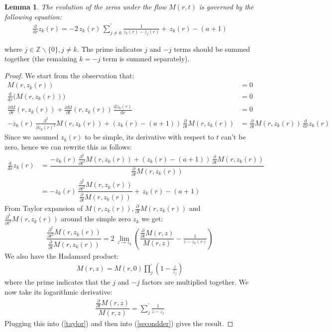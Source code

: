 \documentclass[a4paper,11pt,twoside]{amsart}
\newtheorem{lemma}[theorem]{Lemma}
\newcommand{\verifiedeq}{=}
\newcommand{\verifiedeq}{\stackrel{\checkmark}{=}}
\begin{document}
\begin{lemma}\label{proofBes2} The evolution of the zeros under the flow $M(r,t)$ is governed by the following equation:
\begin{align}
 \frac{\mathrm{d}}{\mathrm{d} r}z_k(r) \verifiedeq -2\, z_k(r)\,\sum_{j \ne k}^{'} \frac{1}{z_k(r)-z_j(r)} +\,z_k(r)-(a+1)
\end{align}
\end{lemma}
where $j \in \mathbb{Z}\backslash\{0\}, j \ne k$. The prime indicates $j$ and $-j$ terms should be summed together (the remaining $k=-j$ term is summed separately).
\begin{proof}
We start from the observation that:
\begin{align}
M(r,z_k(r)) &\verifiedeq 0 \\
\frac{\mathrm{d}}{\mathrm{d} r} \big(M(r,z_k(r))\big) &\verifiedeq 0 \\
\frac{\partial M}{\partial r}(r,z_k(r))+ \frac{\partial M}{\partial t}(r,z_k(r))\,\frac{\mathrm{d} z_k(r)}{\mathrm{d} r} &\verifiedeq 0 \\
-z_k(r)\,\frac{\partial^2}{\partial z_k(r)^2}M(r,z_k(r)) + (z_k(r)-(a+1))\,\frac{\partial }{\partial t}M(r,z_k(r))  &\verifiedeq \frac{\partial}{\partial t}M(r,z_k(r))\,\frac{\mathrm{d}}{\mathrm{d} r}z_k(r)
\end{align}
Since we assumed $z_k(r)$ to be simple, its derivative with respect to $t$ can't be zero, hence we can rewrite this as follows:
\begin{align}
\frac{\mathrm{d} }{\mathrm{d} r}z_k(r) &\verifiedeq \dfrac{-z_k(r)\,\frac{\partial^2}{\partial t^2}M(r,z_k(r)) + (z_k(r)-(a+1))\,\frac{\partial }{\partial t}M(r,z_k(r))}{ \frac{\partial}{\partial t}M(r,z_k(r))} \\
&\verifiedeq -z_k(r)\,\dfrac{\frac{\partial^2}{\partial t^2}M(r,z_k(r))}{ \frac{\partial}{\partial t}M(r,z_k(r))}  + \,z_k(r)-(a+1)\label{secondder}
\end{align}
From Taylor expansion of $M(r,z_k(r)), \frac{\partial}{\partial t}M(r,z_k(r))$ and $\frac{\partial^2}{\partial t^2}M(r,z_k(r))$ around the simple zero $z_k$ we get:
\begin{align}\label{taylor}
 \dfrac{\frac{\partial^2}{\partial t^2}M(r,z_k(r))}{\frac{\partial}{\partial t}M(r,z_k(r))} \verifiedeq 2\,\lim_{z\to z_k} \left(\dfrac{\frac{\partial}{\partial t}M(r,z)}{M(r,z)} -\frac{1}{z - z_k(r)} \right)
\end{align}
We also have the Hadamard product: 
\begin{align}
  M(r,z) \verifiedeq M(r,0)\prod_j^{'}\left(1-\frac{z}{z_j}\right)
\end{align}
where the prime indicates that the $j$ and $-j$ factors are multiplied together. We now take its logarithmic derivative:
\begin{align}
  \dfrac{\frac{\partial}{\partial t}M(r,z)}{M(r,z)} \verifiedeq \sum_j^{'} \frac{1}{z-z_j}
\end{align}
Plugging this into (\ref{taylor}) and then into (\ref{secondder}) gives the result.
\end{proof}
\end{document}
